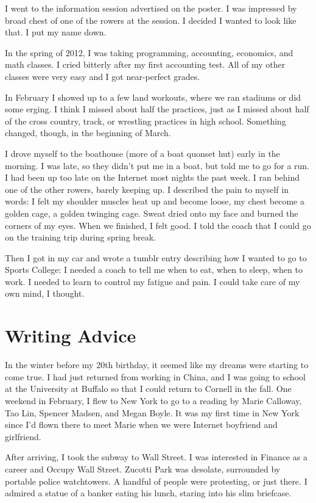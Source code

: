 \documentclass[12pt]{article}
\begin{document}
I went to the information session advertised on the poster.  I was impressed by
 broad chest of one of the rowers at the session.  I decided I
wanted to look like that.  I put my name down.

In the spring of 2012, I was taking programming, accounting, economics, and
math classes.  I cried bitterly after my first accounting test.  All of my
other classes were very easy and I got near-perfect grades.

In February I showed up to a few land workouts, where we ran stadiums or did
some erging.  I think I missed about half the practices, just as I missed about
half of the cross country, track, or wrestling practices in high school.
Something changed, though, in the beginning of March.

I drove myself to the boathouse (more of a boat quonset hut) early in the
morning.  I was late, so they didn't put me in a boat, but told me to go for a
run.  I had been up too late on the Internet most nights the past week.  I ran
behind one of the other rowers, barely keeping up.  I described the pain to
myself in words: I felt my shoulder muscles heat up and become loose, my chest
become a golden cage, a golden twinging cage.  Sweat dried onto my face and
burned the corners of my eyes.  When we finished, I felt good.  I told the coach
that I could go on the training trip during spring break.  

Then I got in my car and wrote a tumblr entry describing how I wanted to go to
Sports College: I needed a coach to tell me when to eat, when to sleep, when to
work.  I needed to learn to control my fatigue and pain.  I could take care of
my own mind, I thought.

\section{Writing Advice}
In the winter before my 20th birthday, it seemed like my dreams were starting to
come true.  I had just returned from working in China, and I was going to school
at the University at Buffalo so that I could return to Cornell in the fall.  One
weekend in February, I flew to New York to go to a reading by Marie Calloway,
Tao Lin, Spencer Madsen, and Megan Boyle.  It was my first time in New York
since I'd flown there to meet Marie when we were Internet boyfriend and
girlfriend.  

After arriving, I took the subway to Wall Street.  I was interested in Finance
as a career and Occupy Wall Street.  Zucotti Park was desolate, surrounded by
portable police watchtowers. A handful of people were protesting, or just there.
I admired a statue of a banker eating his lunch, staring into his slim
briefcase.
\end{document}
